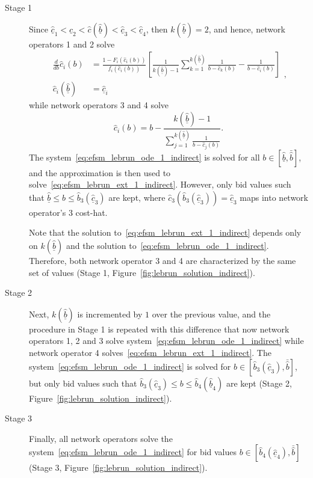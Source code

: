 \begin{description}
\item[Stage 1] Since $\underline{\hat{c}}_1 < \underline{\hat{c}}_2 < \hat{c}(\underline{\hat{b}}) < \underline{\hat{c}}_3 < \underline{\hat{c}}_4$, then $k(\underline{\hat{b}}) = 2$, and hence, network operators 1 and 2 solve
\begin{equation}
  \label{eq:efsm_lebrun_ode_1_indirect}
  \begin{array}{ll}
    \displaystyle\frac{d}{db}\hat{c}_i(b) &= \displaystyle\frac{1 - F_i(\hat{c}_i(b))}{f_i(\hat{c}_i(b))}\left[ \frac{1}{k(\underline{\hat{b}})-1}\sum_{k=1}^{k(\underline{\hat{b}})}\frac{1}{b - \hat{c}_k(b)} - \frac{1}{b - \hat{c}_i(b)} \right] \\[2ex]
    \hat{c}_i(\underline{\hat{b}}) &= \underline{\hat{c}}_i
  \end{array},
\end{equation}
while network operators 3 and 4 solve
\begin{equation}
  \label{eq:efsm_lebrun_ext_1_indirect}
  \hat{c}_i(b) = b - \frac{k(\underline{\hat{b}}) - 1}{\sum_{j=1}^{k(\underline{\hat{b}})} \frac{1}{b-\hat{c}_j(b)}}.
\end{equation}
The system~\eqref{eq:efsm_lebrun_ode_1_indirect} is solved for all $b\in[\underline{\hat{b}},\bar{\hat{b}}]$, and the approximation is then used to solve~\eqref{eq:efsm_lebrun_ext_1_indirect}. However, only bid values such that $\underline{\hat{b}} \leq b\leq \hat{b}_3(\underline{\hat{c}}_3)$ are kept, where $\hat{c}_3(\hat{b}_3(\underline{\hat{c}}_3)) = \underline{\hat{c}}_3$ maps into network operator's 3 cost-hat.

Note that the solution to~\eqref{eq:efsm_lebrun_ext_1_indirect} depends only on $k(\underline{\hat{b}})$ and the solution to~\eqref{eq:efsm_lebrun_ode_1_indirect}. Therefore, both network operator 3 and 4 are characterized by the same set of values (Stage 1, Figure~\ref{fig:lebrun_solution_indirect}).

\item[Stage 2] Next, $k(\underline{\hat{b}})$ is incremented by $1$ over the previous value, and the procedure in Stage 1 is repeated with this difference that now network operators 1, 2 and 3 solve system~\eqref{eq:efsm_lebrun_ode_1_indirect} while network operator 4 solves~\eqref{eq:efsm_lebrun_ext_1_indirect}. The system~\eqref{eq:efsm_lebrun_ode_1_indirect} is solved for $b\in [\hat{b}_3(\underline{\hat{c}}_3), \bar{\hat{b}}]$, but only bid values such that $\hat{b}_3(\underline{\hat{c}}_3)\leq b\leq \hat{b}_4(\underline{\hat{b}}_4)$ are kept (Stage 2, Figure~\ref{fig:lebrun_solution_indirect}).

\item[Stage 3] Finally, all network operators solve the system~\eqref{eq:efsm_lebrun_ode_1_indirect} for bid values $b\in [\hat{b}_4(\underline{\hat{c}}_4),\bar{\hat{b}}]$ (Stage 3, Figure~\ref{fig:lebrun_solution_indirect}).
\end{description}


